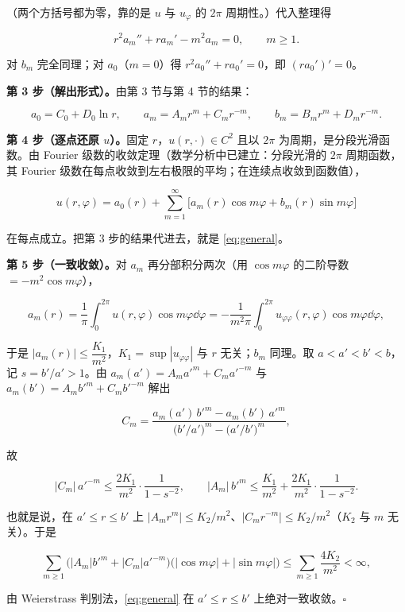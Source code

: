 \documentclass[11pt]{ctexart}
\begin{document}
（两个方括号都为零，靠的是 $u$ 与 $u_\varphi$ 的 $2\pi$ 周期性。）代入整理得

\[
r^2a_m''+ra_m'-m^2a_m=0,\qquad m\ge1 .
\]

对 $b_m$ 完全同理；对 $a_0$（$m=0$）得 $r^2a_0''+ra_0'=0$，即 $(r a_0')'=0$。

\textbf{第 3 步（解出形式）。}由第 3 节与第 4 节的结果：

\[
a_0=C_0+D_0\ln r,\qquad
a_m=A_mr^m+C_mr^{-m},\qquad
b_m=B_mr^m+D_mr^{-m}.
\]

\textbf{第 4 步（逐点还原 $u$）。}固定 $r$，$u(r,\cdot)\in C^2$ 且以 $2\pi$ 为周期，是分段光滑函数。由 Fourier 级数的收敛定理（数学分析中已建立：分段光滑的 $2\pi$ 周期函数，其 Fourier 级数在每点收敛到左右极限的平均；在连续点收敛到函数值），

\[
u(r,\varphi)=a_0(r)+\sum_{m=1}^{\infty}\big[a_m(r)\cos m\varphi+b_m(r)\sin m\varphi\big]
\]

在每点成立。把第 3 步的结果代进去，就是 \eqref{eq:general}。

\textbf{第 5 步（一致收敛）。}对 $a_m$ 再分部积分两次（用 $\cos m\varphi$ 的二阶导数 $=-m^2\cos m\varphi$），

\[
a_m(r)=\frac1\pi\int_0^{2\pi}u(r,\varphi)\cos m\varphi\dd\varphi
=-\frac1{m^2\pi}\int_0^{2\pi}u_{\varphi\varphi}(r,\varphi)\cos m\varphi\dd\varphi ,
\]

于是 $|a_m(r)|\le\dfrac{K_1}{m^2}$，$K_1=\sup|u_{\varphi\varphi}|$ 与 $r$ 无关；$b_m$ 同理。取 $a<a'<b'<b$，记 $s=b'/a'>1$。由 $a_m(a')=A_ma'^m+C_ma'^{-m}$ 与 $a_m(b')=A_mb'^m+C_mb'^{-m}$ 解出

\[
C_m=\frac{a_m(a')\,b'^m-a_m(b')\,a'^m}{\big(b'/a'\big)^m-\big(a'/b'\big)^m},
\]

故

\[
|C_m|\,a'^{-m}\le\frac{2K_1}{m^2}\cdot\frac{1}{1-s^{-2}},\qquad
|A_m|\,b'^m\le\frac{K_1}{m^2}+\frac{2K_1}{m^2}\cdot\frac{1}{1-s^{-2}} .
\]

也就是说，在 $a'\le r\le b'$ 上 $|A_mr^m|\le K_2/m^2$、$|C_mr^{-m}|\le K_2/m^2$（$K_2$ 与 $m$ 无关）。于是

\[
\sum_{m\ge1}\Big(|A_m|b'^m+|C_m|a'^{-m}\Big)\big(|\cos m\varphi|+|\sin m\varphi|\big)
\le\sum_{m\ge1}\frac{4K_2}{m^2}<\infty ,
\]

由 Weierstrass 判别法，\eqref{eq:general} 在 $a'\le r\le b'$ 上绝对一致收敛。$\square$

\end{document}
